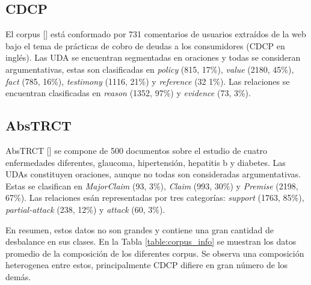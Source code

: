 \subsection{CDCP}\label{corpus:cdcp}

El corpus [\cite{niculae2017argument}] está conformado por 731 comentarios de usuarios extraídos de la web bajo el tema de 
prácticas de cobro de deudas a los consumidores (CDCP en inglés).
Las UDA se encuentran segmentadas en oraciones y todas se consideran argumentativas, estas son clasificadas en 
\emph{policy} (815, 17\%), \emph{value} (2180, 45\%), \emph{fact} (785, 16\%), \emph{testimony} (1116, 21\%) y \emph{reference} (32 1\%). 
Las relaciones se encuentran clasificadas en \emph{reason} (1352, 97\%) y \emph{evidence} (73, 3\%).

\subsection{AbsTRCT}

AbsTRCT [\cite{mayer2020transformer}] se compone de 500 documentos sobre el estudio de cuatro enfermedades diferentes,
glaucoma, hipertensión, hepatitis b y diabetes. Las UDAs constituyen oraciones, aunque no todas son consideradas
argumentativas. Estas se clasifican en \emph{MajorClaim} (93, 3\%), \emph{Claim} (993, 30\%) y \emph{Premise} (2198, 67\%).
Las relaciones esán representadas por tres categorías: \emph{support} (1763, 85\%), \emph{partial-attack} (238, 12\%) y
\emph{attack} (60, 3\%).

En resumen, estos datos no son grandes y contiene una gran cantidad de desbalance en sus clases.
En la Tabla \ref{table:corpus_info} se muestran los datos promedio de la composición de los diferentes corpus. 
Se observa una composición heterogenea entre estos, principalmente CDCP difiere en gran número de los demás.

\begin{table}[h!]
	\begin{center}
	\caption{Información de promedios de los conjuntos de datos.}\label{table:corpus_info}
	\end{center}
\end{table}


